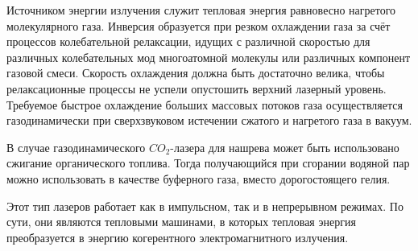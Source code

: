 Источником энергии излучения служит тепловая энергия равновесно нагретого 
молекулярного газа. Инверсия образуется при резком охлаждении газа за счёт 
процессов колебательной релаксации, идущих с различной скоростью для различных 
колебательных мод многоатомной молекулы или различных компонент газовой смеси. 
Скорость охлаждения должна быть достаточно велика, чтобы релаксационные 
процессы не успели опустошить верхний лазерный уровень. Требуемое быстрое 
охлаждение больших массовых потоков газа осуществляется газодинамически при 
сверхзвуковом истечении сжатого и нагретого газа в вакуум.

В случае газодинамического \( CO_2 \)-лазера для нашрева может быть 
использовано сжигание органического топлива. Тогда получающийся при сгорании 
водяной пар можно использовать в качестве буферного газа, вместо 
дорогостоящего гелия.

Этот тип лазеров работает как в импульсном, так и в непрерывном режимах. По 
сути, они являются тепловыми машинами, в которых тепловая энергия 
преобразуется в энергию когерентного электромагнитного излучения.
